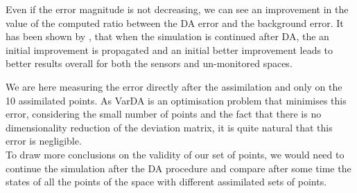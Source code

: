 Even if the error magnitude is not decreasing, we can see an improvement in the value of the computed ratio between the DA error and the background error. It has been shown by \citet{arcucci_optimal_2019}, that when the simulation is continued after DA, the an initial improvement is propagated and an initial better improvement leads to better results overall for both the sensors and un-monitored spaces. 


We are here measuring the error directly after the assimilation and only on the 10 assimilated points. As VarDA is an optimisation problem that minimises this error,  considering the small number of points and the fact that there is no dimensionality reduction of the deviation matrix, it is quite natural that this error is negligible.  \\

To draw more conclusions on the validity of our set of points, we would need to continue the simulation after the DA procedure and compare after some time the states of all the points of the space with different assimilated sets of points. \\



 



